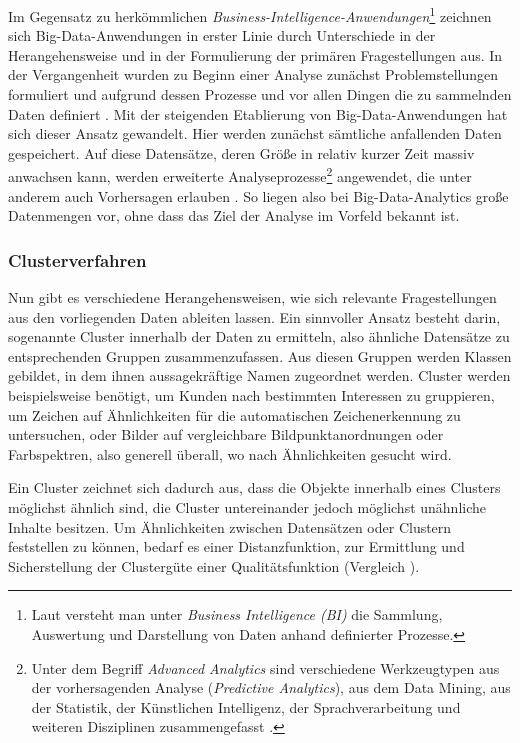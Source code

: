 Im Gegensatz zu herkömmlichen \textit{Business-Intelligence-Anwendungen}\footnote{Laut  versteht man unter \textit{Business Intelligence (BI)} die Sammlung, Auswertung und Darstellung von Daten anhand definierter Prozesse.} zeichnen sich Big-Data-Anwendungen in erster Linie durch Unterschiede in der Herangehensweise und in der Formulierung der primären Fragestellungen aus. In der Vergangenheit wurden zu Beginn einer Analyse zunächst Problemstellungen formuliert und aufgrund dessen Prozesse und vor allen Dingen die zu sammelnden Daten definiert . Mit der steigenden Etablierung von Big-Data-Anwendungen hat sich dieser Ansatz gewandelt. Hier werden zunächst sämtliche anfallenden Daten gespeichert. Auf diese Datensätze, deren Größe in relativ kurzer Zeit massiv anwachsen kann, werden erweiterte Analyseprozesse\footnote{Unter dem Begriff \textit{Advanced Analytics} sind verschiedene Werkzeugtypen aus der vorhersagenden Analyse (\textit{Predictive Analytics}), aus dem Data Mining, aus der Statistik, der Künstlichen Intelligenz, der Sprachverarbeitung und weiteren Disziplinen zusammengefasst .} angewendet, die unter anderem auch Vorhersagen erlauben . 
So liegen also bei Big-Data-Analytics große Datenmengen vor, ohne dass das Ziel der Analyse im Vorfeld bekannt ist. 

\subsubsection{Clusterverfahren}
\label{section:clusterverfahren}

Nun gibt es verschiedene Herangehensweisen, wie sich relevante Fragestellungen aus den vorliegenden Daten ableiten lassen. Ein sinnvoller Ansatz besteht darin, sogenannte Cluster innerhalb der Daten zu ermitteln, also ähnliche Datensätze zu entsprechenden Gruppen zusammenzufassen. Aus diesen Gruppen werden Klassen gebildet, in dem ihnen aussagekräftige Namen zugeordnet werden. Cluster werden beispielsweise benötigt, um Kunden nach bestimmten Interessen zu gruppieren, um Zeichen auf Ähnlichkeiten für die automatischen Zeichenerkennung zu untersuchen, oder Bilder auf vergleichbare Bildpunktanordnungen oder Farbspektren, also generell überall, wo nach Ähnlichkeiten gesucht wird. 

Ein Cluster zeichnet sich dadurch aus, dass die Objekte innerhalb eines Clusters möglichst ähnlich sind, die Cluster untereinander jedoch möglichst unähnliche Inhalte besitzen. Um Ähnlichkeiten zwischen Datensätzen oder Clustern feststellen zu können, bedarf es einer Distanzfunktion, zur Ermittlung und Sicherstellung der Clustergüte einer Qualitätsfunktion (Vergleich ). 

